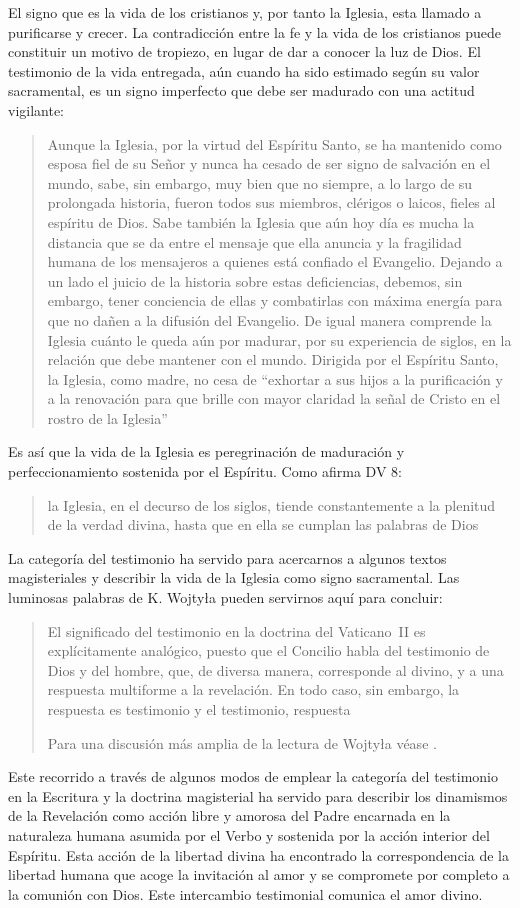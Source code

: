 El signo que es la vida de los cristianos y, por tanto la Iglesia, esta llamado a purificarse y crecer. La contradicción entre la fe y la vida de los cristianos puede constituir un motivo de tropiezo, en lugar de dar a conocer la luz de Dios. El testimonio de la vida entregada, aún cuando ha sido estimado según su valor sacramental, es un signo imperfecto que debe ser madurado con una actitud vigilante: \blockquote[][\,(GS 34)]{Aunque la Iglesia, por la virtud del Espíritu Santo, se ha mantenido como esposa fiel de su Señor y nunca ha cesado de ser signo de salvación en el mundo, sabe, sin embargo, muy bien que no siempre, a lo largo de su prolongada historia, fueron todos sus miembros, clérigos o laicos, fieles al espíritu de Dios. Sabe también la Iglesia que aún hoy día es mucha la distancia que se da entre el mensaje que ella anuncia y la fragilidad humana de los mensajeros a quienes está confiado el Evangelio. Dejando a un lado el juicio de la historia sobre estas deficiencias, debemos, sin embargo, tener conciencia de ellas y combatirlas con máxima energía para que no dañen a la difusión del Evangelio. De igual manera comprende la Iglesia cuánto le queda aún por madurar, por su experiencia de siglos, en la relación que debe mantener con el mundo. Dirigida por el Espíritu Santo, la Iglesia, como madre, no cesa de ``exhortar a sus hijos a la purificación y a la renovación para que brille con mayor claridad la señal de Cristo en el rostro de la Iglesia''}. Es así que la vida de la Iglesia es peregrinación de maduración y perfeccionamiento sostenida por el Espíritu. Como afirma DV 8: \blockquote{la Iglesia, en el decurso de los siglos, tiende constantemente a la plenitud de la verdad divina, hasta que en ella se cumplan las palabras de Dios}.

La categoría del testimonio ha servido para acercarnos a algunos textos magisteriales y describir la vida de la Iglesia como signo sacramental. Las luminosas palabras de K. Wojtyła pueden servirnos aquí para concluir: \blockquote[Para una discusión más amplia de la lectura de Wojtyła véase {\cite[194-197]{prades2015testimonio}}.]{El significado del testimonio en la doctrina del Vaticano~II es explícitamente analógico, puesto que el Concilio habla del testimonio de Dios y del hombre, que, de diversa manera, corresponde al divino, y a una respuesta multiforme a la revelación. En todo caso, sin embargo, la respuesta es testimonio y el testimonio, respuesta}.

Este recorrido a través de algunos modos de emplear la categoría del testimonio en la Escritura y la doctrina magisterial ha servido para describir los dinamismos de la Revelación como acción libre y amorosa del Padre encarnada en la naturaleza humana asumida por el Verbo y sostenida por la acción interior del Espíritu. Esta acción de la libertad divina ha encontrado la correspondencia de la libertad humana que acoge la invitación al amor y se compromete por completo a la comunión con Dios. Este intercambio testimonial comunica el amor divino.
